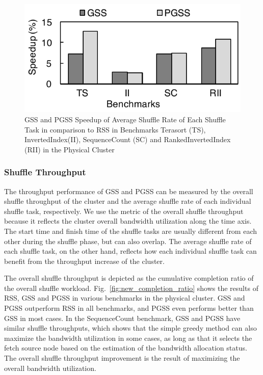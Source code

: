 \documentclass[10pt,journal,compsoc]{IEEEtran}
\begin{document}
\begin{figure}
\centering
\includegraphics[width=0.7\columnwidth,height=0.35\columnwidth]{figure6}
\caption{GSS and PGSS Speedup of Average Shuffle Rate of Each Shuffle Task in comparison to RSS in Benchmarks Terasort (TS), InvertedIndex(II), SequenceCount (SC) and RankedInvertedIndex (RII) in the Physical Cluster} 
\label{fig:new_shuffle_rate}
\end{figure}

\subsubsection{Shuffle Throughput}
The throughput performance of GSS and PGSS can be measured by the overall shuffle
throughput of the cluster
and the average shuffle rate of each individual shuffle task, respectively. 
We use the metric of the overall shuffle throughput because it
reflects the cluster overall bandwidth utilization along the time axis.
The start time and finish time of the shuffle tasks are usually different from each other during the shuffle phase, but can also overlap. 
The average shuffle rate of each shuffle task, on the other hand, reflects how each individual shuffle task can benefit from the throughput increase of the cluster.

The overall shuffle throughput is depicted as the cumulative
completion ratio of the overall shuffle workload.
Fig.~\ref{fig:new_completion_ratio} shows the results of RSS, GSS
and PGSS in various benchmarks in the physical cluster.
GSS and PGSS outperform RSS in all benchmarks, 
and PGSS even performs better than GSS in most cases. 
In the SequenceCount benchmark, GSS and PGSS have similar shuffle
throughputs, %
which shows that the simple greedy method can also maximize the
bandwidth utilization in some cases,
as long as that it selects the fetch source node based on the estimation of the bandwidth allocation status. 
The overall shuffle throughput improvement is the result of maximizing
the overall bandwidth utilization.
\end{document}
